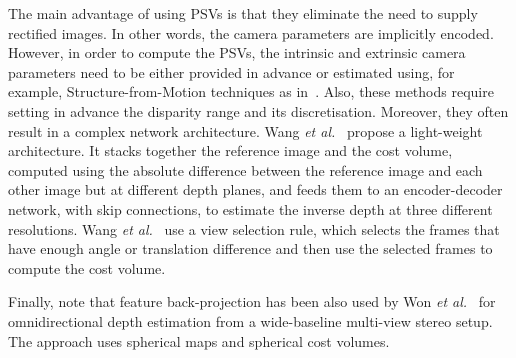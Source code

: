 \documentclass[10pt,journal,compsoc]{IEEEtran}
\newcommand{\etal}{\emph{et al.}}
\begin{document}
The main advantage of using PSVs is that they eliminate the need to supply rectified images.  In other words, the camera parameters are implicitly encoded.  However, in order to compute the PSVs, the intrinsic and extrinsic camera parameters need to be either provided in advance or estimated using, for example, Structure-from-Motion techniques as in~\cite{huang2018deepmvs}.  Also, these methods require setting in advance the disparity range and its discretisation.  Moreover, they often result in a complex network architecture.  Wang \etal~\cite{wang2018mvdepthnet}  propose a light-weight architecture. It stacks  together the reference image and the cost volume, computed using the absolute difference between the reference image and each other image but at different depth planes,  and feeds them to an encoder-decoder network, with skip connections, to estimate the inverse depth at three different resolutions.  Wang \etal~\cite{wang2018mvdepthnet}  use a view selection rule, which selects the frames that have enough angle or translation difference and then use the selected frames to compute the cost volume. 


Finally, note that feature back-projection has been also used   by Won \etal~\cite{Won_2019_ICCV}  for omnidirectional depth estimation from a wide-baseline multi-view stereo setup. The approach uses spherical maps and spherical cost volumes.
\end{document}
